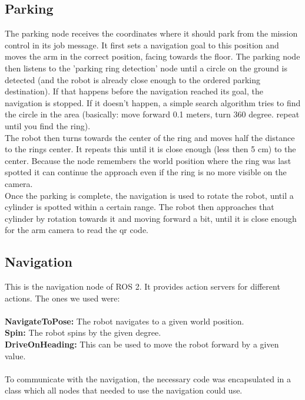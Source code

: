 \documentclass[a4paper,
  twoside, %
  headlines=2.1 %
  ]{scrartcl}
\begin{document}
\subsection{Parking}
The parking node receives the coordinates where it should park from the mission control in its job message. It first sets a navigation goal to this position and moves the arm in the correct position, facing towards the floor. The parking node then listens to the 'parking ring detection' node until a circle on the ground is detected (and the robot is already close enough to the ordered parking destination). If that happens before the navigation reached its goal, the navigation is stopped. If it doesn't happen, a simple search algorithm tries to find the circle in the area (basically: move forward 0.1 meters, turn 360 degree. repeat until you find the ring).\\
The robot then turns towards the center of the ring and moves half the distance to the rings center. It repeats this until it is close enough (less then 5 cm) to the center. Because the node remembers the world position where the ring was last spotted it can continue the approach even if the ring is no more visible on the camera.\\
Once the parking is complete, the navigation is used to rotate the robot, until a cylinder is spotted within a certain range. The robot then approaches that cylinder by rotation towards it and moving forward a bit, until it is close enough for the arm camera to read the qr code.

\subsection{Navigation}
This is the navigation node of ROS 2. It provides action servers for different actions. The ones we used were:\\
\\
\textbf{NavigateToPose:} The robot navigates to a given world position.\\
\textbf{Spin:} The robot spins by the given degree.\\
\textbf{DriveOnHeading:} This can be used to move the robot forward by a given value.\\
\\
To communicate with the navigation, the necessary code was encapsulated in a class which all nodes that needed to use the navigation could use.
\end{document}
